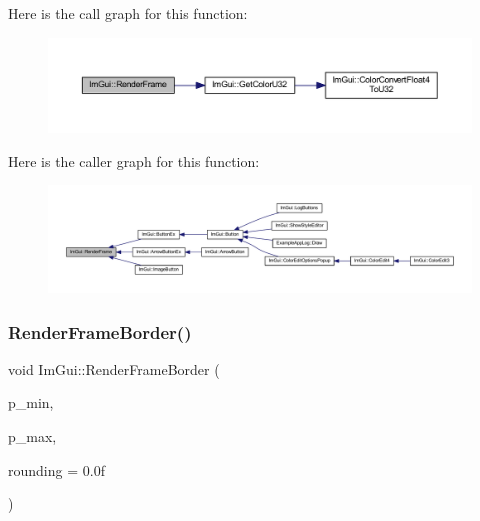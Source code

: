 Here is the call graph for this function\+:
\nopagebreak
\begin{figure}[H]
\begin{center}
\leavevmode
\includegraphics[width=350pt]{namespace_im_gui_a621ba649568ede3939d4f10d83b86d04_cgraph}
\end{center}
\end{figure}
Here is the caller graph for this function\+:
\nopagebreak
\begin{figure}[H]
\begin{center}
\leavevmode
\includegraphics[width=350pt]{namespace_im_gui_a621ba649568ede3939d4f10d83b86d04_icgraph}
\end{center}
\end{figure}
\mbox{\label{namespace_im_gui_adc76239c2006e66f8dab7638529a763d}} 
\subsubsection{\texorpdfstring{Render\+Frame\+Border()}{RenderFrameBorder()}}
{\footnotesize\ttfamily void Im\+Gui\+::\+Render\+Frame\+Border (\begin{DoxyParamCaption}\item[{\mbox{\hyperlink{struct_im_vec2}{Im\+Vec2}}}]{p\+\_\+min,  }\item[{\mbox{\hyperlink{struct_im_vec2}{Im\+Vec2}}}]{p\+\_\+max,  }\item[{float}]{rounding = {\ttfamily 0.0f} }\end{DoxyParamCaption})}

